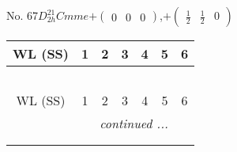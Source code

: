 \documentclass[fleqn,9pt,landscape]{jsarticle}
\begin{document}
\newpage
No. 67\quad$D_{2h}^{21}$\quad$Cmme$\quad[ orthorhombic ]\quad$+\begin{pmatrix} 0 & 0 & 0 \end{pmatrix}$,\quad $+\begin{pmatrix} \frac{1}{2} & \frac{1}{2} & 0 \end{pmatrix}$
\begin{center}
\renewcommand{\arraystretch}{1.2}
\begin{longtable}{ccccccc}
 \hline \hline
WL (SS) & 1 & 2 & 3 & 4 & 5 & 6 \\ \hline \endfirsthead

\multicolumn{6}{l}{\tablename\ \thetable{}} \\
 \hline \hline
WL (SS) & 1 & 2 & 3 & 4 & 5 & 6 \\ \hline \endhead

 \hline \hline
\multicolumn{6}{r}{\footnotesize\it continued ...} \\ \endfoot

 \hline \hline
\multicolumn{6}{r}{} \\ \endlastfoot


\end{longtable}
\end{center}
\end{document}
